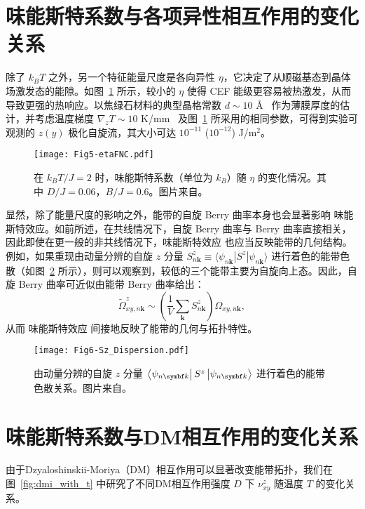         
    \section{味能斯特系数与各项异性相互作用的变化关系}
        除了 $k_B T$ 之外，另一个特征能量尺度是各向异性 $\eta$，它决定了从顺磁基态到晶体场激发态的能隙。如图~\ref{fig:D0.06_B0.6_eta} 所示，较小的 $\eta$ 使得 CEF 能级更容易被热激发，从而导致更强的热响应。以焦绿石材料的典型晶格常数 $d\sim 10$ \AA~\cite{wen2021epitaxial} 作为薄膜厚度的估计，并考虑温度梯度 $\nabla_z T\sim 10$ K/mm~\cite{lin2022Evidence} 及图~\ref{fig:D0.06_B0.6_eta} 所采用的相同参数，可得到实验可观测的 $z(y)$ 极化自旋流，其大小可达 $10^{-11}$ ($10^{-12}$) J/m$^2$。

        \begin{figure}[th]
            \centering
            \texttt{[image: Fig5-etaFNC.pdf]}
            \caption{在 $k_B T/J=2$ 时，味能斯特系数（单位为 $k_B$）随 $\eta$ 的变化情况。其中 $D/J=0.06$，$B/J=0.6$。图片来自\cite{lu2024Spin}。}
            \label{fig:D0.06_B0.6_eta}
        \end{figure}
        
        显然，除了能量尺度的影响之外，能带的自旋 Berry 曲率本身也会显著影响 味能斯特效应。如前所述，在共线情况下，自旋 Berry 曲率与 Berry 曲率直接相关，因此即使在更一般的非共线情况下，味能斯特效应 也应当反映能带的几何结构。例如，如果重现由动量分辨的自旋 $z$ 分量 $S^z_{n{\bm{k}}} \equiv \langle \psi_{n{\bm{k}}} | S^z | \psi_{n{\bm{k}}} \rangle$ 进行着色的能带色散（如图~\ref{fig:Sz-Dispersion} 所示），则可以观察到，较低的三个能带主要为自旋向上态。因此，自旋 Berry 曲率可近似由能带 Berry 曲率给出：
        \begin{equation}
            \tilde{\Omega}^z_{xy,n{\bm{k}}} \sim \left( \frac{1}{V} \sum_{\bm{k}} S^z_{n{\bm{k}}} \right) \Omega_{xy,n{\bm{k}}},
        \end{equation}
        从而 味能斯特效应 间接地反映了能带的几何与拓扑特性。

        \begin{figure}[bht]
            \centering
            \texttt{[image: Fig6-Sz\_Dispersion.pdf]}
            \caption{由动量分辨的自旋 $z$ 分量 $\bra{\psi_{n{\bm{k}}}} S^z \ket{\psi_{n{\bm{k}}}}$ 进行着色的能带色散关系。图片来自\cite{lu2024Spin}。}
            \label{fig:Sz-Dispersion}
        \end{figure}
        
    \section{味能斯特系数与DM相互作用的变化关系}
        由于Dzyaloshinskii-Moriya（DM）相互作用可以显著改变能带拓扑，我们在图~\ref{fig:dmi_with_t} 中研究了不同DM相互作用强度 $D$ 下 $\nu^{z}_{xy}$ 随温度 $T$ 的变化关系。

